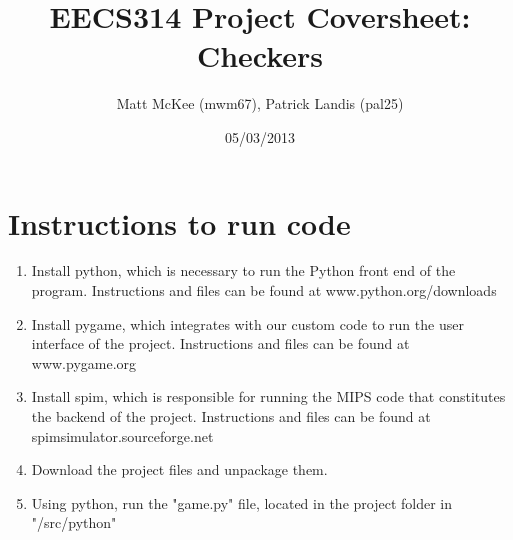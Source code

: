\documentclass[]{article}
\title{EECS314 Project Coversheet: Checkers}
\author{Matt McKee (mwm67), Patrick Landis (pal25)}
\date{05/03/2013}
\begin{document}
\maketitle

\section*{Instructions to run code}
\begin{enumerate}

\item Install python, which is necessary to run the Python front end of the program. Instructions and files can be found at www.python.org/downloads

\item Install pygame, which integrates with our custom code to run the user interface of the project. Instructions and files can be found at www.pygame.org

\item Install spim, which is responsible for running the MIPS code that constitutes the backend of the project. Instructions and files can be found at spimsimulator.sourceforge.net

\item Download the project files and unpackage them.

\item Using python, run the "game.py" file, located in the project folder in "/src/python"

\end{enumerate}
\end{document}
